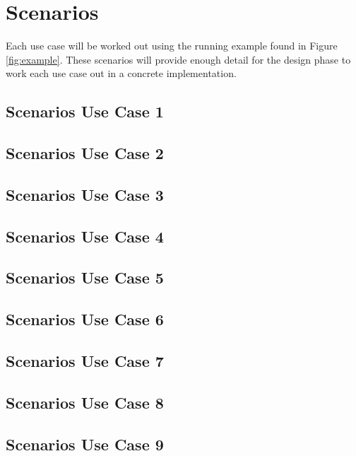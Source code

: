 \newpage

\section{Scenarios}
Each use case will be worked out using the running example found in Figure \ref{fig:example}. These scenarios will provide enough detail for the design phase to work each use case out in a concrete implementation.

\subsection{Scenarios Use Case 1}

\subsection{Scenarios Use Case 2}

\subsection{Scenarios Use Case 3}

\subsection{Scenarios Use Case 4}

\subsection{Scenarios Use Case 5}

\subsection{Scenarios Use Case 6}

\subsection{Scenarios Use Case 7}

\subsection{Scenarios Use Case 8}

\subsection{Scenarios Use Case 9}

